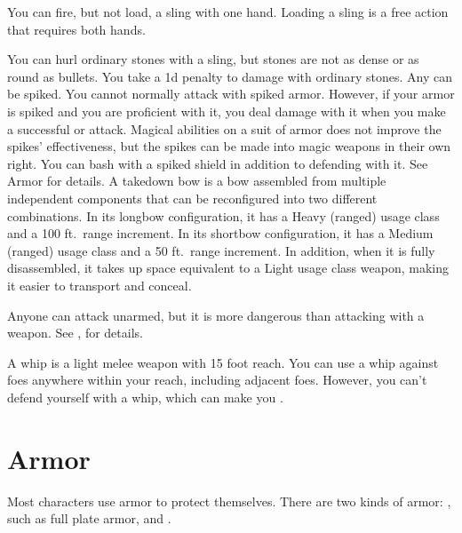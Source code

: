          You can fire, but not load, a sling with one hand. Loading a sling is a free action that requires both hands.
        \par You can hurl ordinary stones with a sling, but stones are not as dense or as round as bullets. You take a \minus1d penalty to damage with ordinary stones.
         Any  can be spiked.
        You cannot normally attack with spiked armor.
        However, if your armor is spiked and you are proficient with it, you deal damage with it when you make a successful  or  attack.
        Magical abilities on a suit of armor does not improve the spikes' effectiveness, but the spikes can be made into magic weapons in their own right.
         You can bash with a spiked shield in addition to defending with it. See Armor for details.
         A takedown bow is a bow assembled from multiple independent components that can be reconfigured into two different combinations.
        In its longbow configuration, it has a Heavy (ranged) usage class and a 100 ft.\ range increment.
        In its shortbow configuration, it has a Medium (ranged) usage class and a 50 ft.\ range increment.
        In addition, when it is fully disassembled, it takes up space equivalent to a Light usage class weapon, making it easier to transport and conceal.

         Anyone can attack unarmed, but it is more dangerous than attacking with a weapon. See , for details.

         A whip is a light melee weapon with 15 foot reach.
        You can use a whip against foes anywhere within your reach, including adjacent foes.
        However, you can't defend yourself with a whip, which can make you .

\section{Armor}\label{Armor}

    Most characters use armor to protect themselves. There are two kinds of armor: , such as full plate armor, and .

